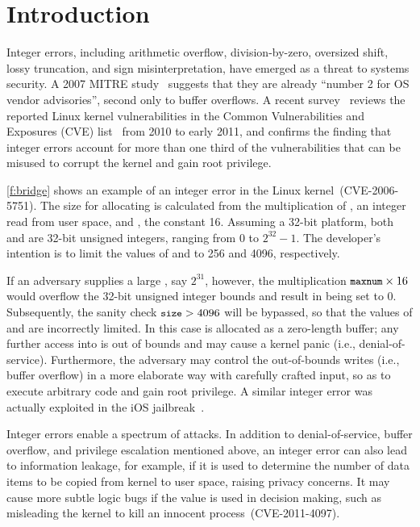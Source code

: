 \section{Introduction}
\label{s:intro}

Integer errors, including arithmetic overflow, division-by-zero,
oversized shift, lossy truncation, and sign misinterpretation, have
emerged as a threat to systems security.  A 2007 MITRE
study~\cite{christey:vuln} suggests that they are already ``number
2 for OS vendor advisories'', second only to buffer overflows.  A recent
survey~\cite{chen:kbugs} reviews the reported Linux kernel
vulnerabilities in the Common Vulnerabilities and Exposures (CVE)
list~\cite{cve} from 2010 to early 2011, and confirms the finding
that integer errors account for more than one third of the
vulnerabilities that can be misused to corrupt the kernel and gain
root privilege.

\autoref{f:bridge} shows an example of an integer error in the Linux
kernel~(CVE-2006-5751).  The size for allocating  is calculated
from the multiplication of , an integer read from user
space, and , the constant 16.  Assuming
a 32-bit platform, both  and  are 32-bit unsigned
integers, ranging from 0 to $2^{32} - 1$.  The developer's intention
is to limit the values of  and  to 256 and 4096,
respectively.

If an adversary supplies a large , say $2^{31}$,
however, the multiplication $\cc{maxnum} \times 16$ would
overflow the 32-bit unsigned integer bounds and result in 
being set to 0.  Subsequently, the sanity check $\cc{size} > 4096$
will be bypassed, so that the values of  and 
are incorrectly limited.  In this case  is allocated as
a zero-length buffer; any further access into  is out of
bounds and may cause a kernel panic (i.e., denial-of-service).
Furthermore, the adversary may control the out-of-bounds writes
(i.e., buffer overflow) in a more elaborate way with carefully
crafted input, so as to execute arbitrary code and gain root
privilege.  A similar integer error was actually exploited
in the iOS jailbreak~\cite{esser:ios}.

Integer errors enable a spectrum of attacks.  In addition to
denial-of-service, buffer overflow, and privilege escalation
mentioned above, an integer error can also lead to information
leakage, for example, if it is used to determine the number of data
items to be copied from kernel to user space, raising privacy
concerns.  It may cause more subtle logic bugs if the value is used
in decision making, such as misleading the kernel to kill an innocent
process~(CVE-2011-4097).

